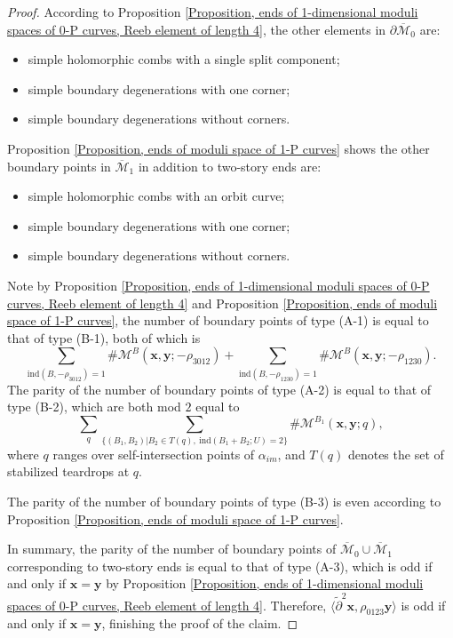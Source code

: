 \documentclass{amsart}
\theoremstyle{definition}
\theoremstyle{remark}
\numberwithin{equation}{section}
\numberwithin{equation}{section} \makeatletter
\begin{document}
\begin{proof}
According to Proposition \ref{Proposition, ends of 1-dimensional moduli spaces of 0-P curves, Reeb element of length 4}, the other elements in $\partial \overline{\mathcal{M}}_0$ are: 
\begin{itemize}
\item[(A-1)]simple holomorphic combs with a single split component;
\item[(A-2)]simple boundary degenerations with one corner;
\item[(A-3)]simple boundary degenerations without corners.
\end{itemize}
Proposition \ref{Proposition, ends of moduli space of 1-P curves} shows the other boundary points in $\overline{\mathcal{M}}_1$ in addition to two-story ends are: 
\begin{itemize}
\item[(B-1)]simple holomorphic combs with an orbit curve;
\item[(B-2)]simple boundary degenerations with one corner;
\item[(B-3)]simple boundary degenerations without corners.
\end{itemize}
Note by Proposition \ref{Proposition, ends of 1-dimensional moduli spaces of 0-P curves, Reeb element of length 4} and Proposition \ref{Proposition, ends of moduli space of 1-P curves}, the number of boundary points of type (A-1) is equal to that of type (B-1), both of which is $$\sum_{\text{ind}(B,-\rho_{3012})=1} \#\mathcal{M}^B(\bm{x},\bm{y};-\rho_{3012})+\sum_{\text{ind}(B,-\rho_{1230})=1} \#\mathcal{M}^B(\bm{x},\bm{y};-\rho_{1230}).$$
The parity of the number of boundary points of type (A-2) is equal to that of type (B-2), which are both mod $2$ equal to $$\sum_ {q}\sum_{\{(B_1,B_2)|B_2\in T(q),\ \text{ind}(B_1+B_2;U)=2\}} \#\mathcal{M}^{B_1}(\bm{x},\bm{y};q),$$
where $q$ ranges over self-intersection points of $\alpha_{im}$, and $T(q)$ denotes the set of stabilized teardrops at $q$. 

The parity of the number of boundary points of type (B-3) is even according to Proposition \ref{Proposition, ends of moduli space of 1-P curves}. 

In summary, the parity of the number of boundary points of $\overline{\mathcal{M}}_0\cup \overline{\mathcal{M}}_1$ corresponding to two-story ends is equal to that of type (A-3), which is odd if and only if $\bm{x}=\bm{y}$ by Proposition \ref{Proposition, ends of 1-dimensional moduli spaces of 0-P curves, Reeb element of length 4}. Therefore, $\langle\tilde{\partial}^2\bm{x}, \rho_{0123}\bm{y}\rangle$ is odd if and only if $\bm{x}=\bm{y}$, finishing the proof of the claim. 


\end{proof}
\end{document}
